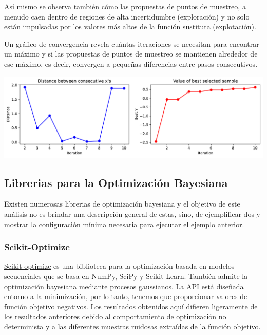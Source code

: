 \documentclass[
  12pt,
  letterpaper,
  DIV=11,
  numbers=noendperiod]{scrartcl}
\begin{document}
Así mismo se observa también cómo las propuestas de puntos de muestreo,
a menudo caen dentro de regiones de alta incertidumbre (exploración) y
no solo están impulsadas por los valores más altos de la función
sustituta (explotación).

Un gráfico de convergencia revela cuántas iteraciones se necesitan para
encontrar un máximo y si las propuestas de puntos de muestreo se
mantienen alrededor de ese máximo, es decir, convergen a pequeñas
diferencias entre pasos consecutivos.

\includegraphics{ProyFinal_OptBayesiana_2024_files/figure-pdf/cell-7-output-1.pdf}

\subsection{Librerias para la Optimización
Bayesiana}\label{librerias-para-la-optimizaciuxf3n-bayesiana}

Existen numerosas librerias de optimización bayesiana y el objetivo de
este análisis no es brindar una descripción general de estas, sino, de
ejemplificar dos y mostrar la configuración mínima necesaria para
ejecutar el ejemplo anterior.

\subsubsection{Scikit-Optimize}\label{scikit-optimize}

\href{https://scikit-optimize.github.io/}{Scikit-optimize} es una
biblioteca para la optimización basada en modelos secuenciales que se
basa en \href{https://numpy.org/}{NumPy},
\href{https://scipy.org/}{SciPy} y
\href{http://scikit-learn.org/}{Scikit-Learn}. También admite la
optimización bayesiana mediante procesos gaussianos. La API está
diseñada entorno a la minimización, por lo tanto, tenemos que
proporcionar valores de función objetivo negativos. Los resultados
obtenidos aquí difieren ligeramente de los resultados anteriores debido
al comportamiento de optimización no determinista y a las diferentes
muestras ruidosas extraídas de la función objetivo.
\end{document}
